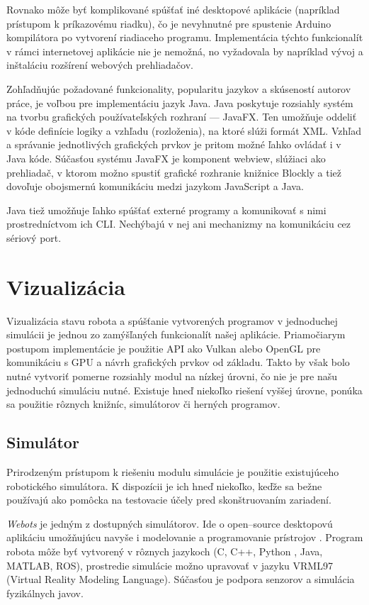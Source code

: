 Rovnako môže byť komplikované spúšťať iné desktopové aplikácie (napríklad prístupom k príkazovému riadku), čo je nevyhnutné pre spustenie Arduino kompilátora po vytvorení riadiaceho programu. Implementácia týchto funkcionalít v rámci internetovej aplikácie nie je nemožná, no vyžadovala by napríklad vývoj a inštaláciu rozšírení webových prehliadačov.

Zohľadňujúc požadované funkcionality, popularitu jazykov a skúseností autorov práce, je voľbou pre implementáciu jazyk Java. Java poskytuje rozsiahly systém na tvorbu grafických používateľských rozhraní --- JavaFX. Ten umožňuje oddeliť v kóde definície logiky a vzhľadu (rozloženia), na ktoré slúži formát XML. Vzhľad a správanie jednotlivých grafických prvkov je pritom možné ľahko ovládať i v Java kóde. Súčasťou systému JavaFX je komponent webview, slúžiaci ako prehliadač, v ktorom možno spustiť grafické rozhranie knižnice Blockly a tiež dovoľuje obojsmernú komunikáciu medzi jazykom JavaScript a Java.

Java tiež umožňuje ľahko spúšťať externé programy a komunikovať s nimi prostredníctvom ich CLI. Nechýbajú v nej ani mechanizmy na komunikáciu cez sériový port.


\section{Vizualizácia}
Vizualizácia stavu robota a spúšťanie vytvorených programov v jednoduchej simulácii je jednou zo zamýšľaných funkcionalít našej aplikácie. Priamočiarym postupom implementácie je použitie API ako Vulkan alebo OpenGL pre komunikáciu s GPU a návrh grafických prvkov od základu. Takto by však bolo nutné vytvoriť pomerne rozsiahly modul na nízkej úrovni, čo nie je pre našu jednoduchú simuláciu nutné. Existuje hneď niekoľko riešení vyššej úrovne, ponúka sa použitie rôznych knižníc, simulátorov či herných programov.

\subsection{Simulátor}
Prirodzeným prístupom k riešeniu modulu simulácie je použitie existujúceho robotického simulátora. K dispozícii je ich hneď niekoľko, keďže sa bežne používajú ako pomôcka na testovacie účely pred skonštruovaním zariadení.

\textit{Webots} je jedným z dostupných simulátorov. Ide o open--source desktopovú aplikáciu umožňujúcu navyše i modelovanie a programovanie prístrojov \cite{Webots}. Program robota môže byť vytvorený v rôznych jazykoch (C, C++, Python , Java, MATLAB, ROS), prostredie simulácie možno upravovať v jazyku VRML97 (Virtual Reality Modeling Language). Súčasťou je podpora senzorov a simulácia fyzikálnych javov.

